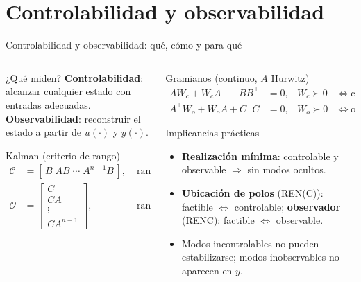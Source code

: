 \documentclass[
    10pt,
    aspectratio=169,
    xcolor={dvipsnames},
    spanish,
    ]{beamer}
\begin{document}
\section{Controlabilidad y observabilidad}
\begin{frame}{Controlabilidad y observabilidad: qué, cómo y para qué}
\footnotesize
\begin{columns}[T]
  \begin{column}{0.52\textwidth}
    \begin{block}{¿Qué miden?}
  	\textbf{Controlabilidad}: alcanzar cualquier estado con entradas adecuadas.\\
  	\textbf{Observabilidad}: reconstruir el estado a partir de $u(\cdot)$ y $y(\cdot)$.
    \end{block}
    \begin{block}{Kalman (criterio de rango)}
      \begin{align}
        \mathcal C &= [\,B\;AB\;\cdots\;A^{n-1}B\,], & \operatorname{rank}(\mathcal C){=}n &\iff \text{controlable},\\
        \mathcal O &= \begin{bmatrix} C\\ CA\\ \vdots\\ CA^{n-1}\end{bmatrix}, & \operatorname{rank}(\mathcal O){=}n &\iff \text{observable}.
      \end{align}
    \end{block}
  \end{column}
  \begin{column}{0.47\textwidth}
    \begin{block}{Gramianos (continuo, $A$ Hurwitz)}
      \begin{align}
        A W_c + W_c A^\top + B B^\top &= 0, & W_c\succ 0 &\iff \text{controlable},\\
        A^\top W_o + W_o A + C^\top C &= 0, & W_o\succ 0 &\iff \text{observable}.
      \end{align}
    \end{block}
    \begin{block}{Implicancias prácticas}
      \begin{itemize}\itemsep2pt
        \item \textbf{Realización mínima}: controlable y observable $\Rightarrow$ sin modos ocultos.
        \item \textbf{Ubicación de polos} (REN(C)): factible $\iff$ controlable; \textbf{observador} (RENC): factible $\iff$ observable.
        \item Modos incontrolables no pueden estabilizarse; modos inobservables no aparecen en $y$.
      \end{itemize}
    \end{block}
  \end{column}
\end{columns}
\end{frame}
\end{document}

